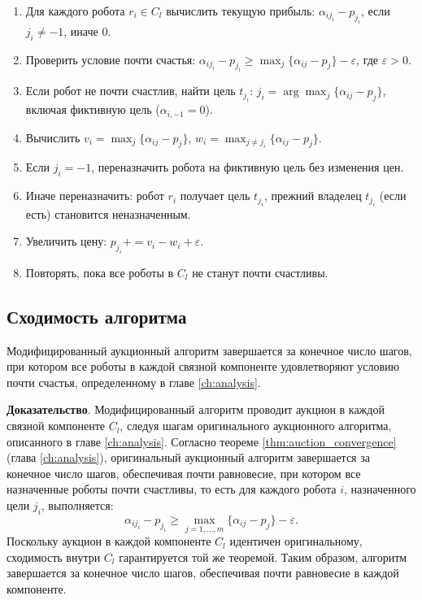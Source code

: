 \begin{enumerate}
\begin{itemize}
\begin{enumerate}
            \item Для каждого робота \( r_i \in C_l \) вычислить текущую прибыль: \( \alpha_{i j_i} - p_{j_i} \), если \( j_i \neq -1 \), иначе \( 0 \).
            \item Проверить условие почти счастья: \( \alpha_{i j_i} - p_{j_i} \geq \max_j \{\alpha_{ij} - p_j\} - \varepsilon \), где \( \varepsilon > 0 \).
            \item Если робот не почти счастлив, найти цель \( t_{j_i} \): \( j_i = \arg \max_j \{\alpha_{ij} - p_j\} \), включая фиктивную цель (\( \alpha_{i,-1} = 0 \)).
            \item Вычислить \( v_i = \max_j \{\alpha_{ij} - p_j\} \), \( w_i = \max_{j \neq j_i} \{\alpha_{ij} - p_j\} \).
            \item Если \( j_i = -1 \), переназначить робота на фиктивную цель без изменения цен.
            \item Иначе переназначить: робот \( r_i \) получает цель \( t_{j_i} \), прежний владелец \( t_{j_i} \) (если есть) становится неназначенным.
            \item Увеличить цену: \( p_{j_i} += v_i - w_i + \varepsilon \).
            \item Повторять, пока все роботы в \( C_l \) не станут почти счастливы.
        \end{enumerate}
    \end{itemize}
\end{enumerate}

\subsection{Сходимость алгоритма}

\begin{theorem}
\label{thm:mod_auction_convergence}
Модифицированный аукционный алгоритм завершается за конечное число шагов, при котором все роботы в каждой связной компоненте удовлетворяют условию почти счастья, определенному в главе \ref{ch:analysis}.
\end{theorem}

\textbf{Доказательство}. 
Модифицированный алгоритм проводит аукцион в каждой связной компоненте \( C_l \), следуя шагам оригинального аукционного алгоритма, описанного в главе \ref{ch:analysis}. Согласно теореме \ref{thm:auction_convergence} (глава \ref{ch:analysis}), оригинальный аукционный алгоритм завершается за конечное число шагов, обеспечивая почти равновесие, при котором все назначенные роботы почти счастливы, то есть для каждого робота \( i \), назначенного цели \( j_i \), выполняется:
\[
\alpha_{i j_i} - p_{j_i} \geq \max_{j=1,\ldots,m} \{\alpha_{ij} - p_j\} - \varepsilon.
\]
Поскольку аукцион в каждой компоненте \( C_l \) идентичен оригинальному, сходимость внутри \( C_l \) гарантируется той же теоремой. Таким образом, алгоритм завершается за конечное число шагов, обеспечивая почти равновесие в каждой компоненте.

